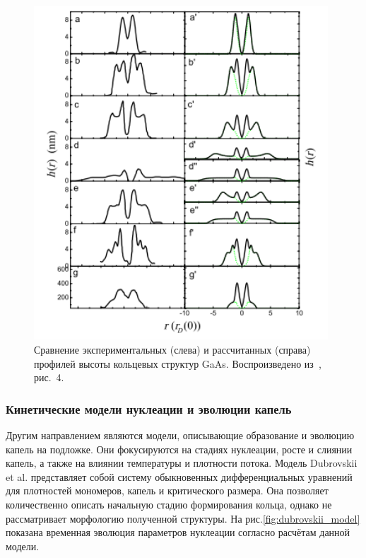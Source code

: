 \documentclass[14pt,oneside]{extarticle}
\begin{document}
\begin{figure}[H]
    \begin{center}
        \includegraphics[width=11cm]{images/zhou_profiles.png}
        \caption{\label{fig:zhou_profiles}
            Сравнение экспериментальных (слева) и рассчитанных (справа) профилей высоты кольцевых структур GaAs. Воспроизведено из~\cite{zhou2013}, рис.~4.}
    \end{center}
\end{figure}

\subsubsection*{Кинетические модели нуклеации и эволюции капель}
Другим направлением являются модели, описывающие образование и эволюцию капель на подложке. Они фокусируются на стадиях нуклеации, росте и слиянии капель, а также на влиянии температуры и плотности потока. Модель Dubrovskii et al.\cite{dubrovskii2021} представляет собой систему обыкновенных дифференциальных уравнений для плотностей мономеров, капель и критического размера. Она позволяет количественно описать начальную стадию формирования кольца, однако не рассматривает морфологию полученной структуры. На рис.\ref{fig:dubrovskii_model} показана временная эволюция параметров нуклеации согласно расчётам данной модели.
\end{document}
